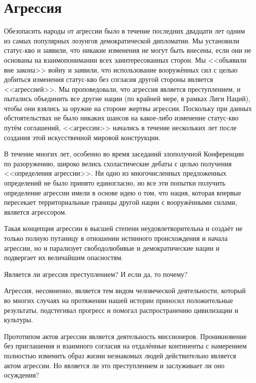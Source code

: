 \chapter{Агрессия}

Обезопасить народы от агрессии было в течение последних двадцати лет одним из самых популярных лозунгов демократической дипломатии. Мы установили статус-кво и заявили, что никакие изменения не могут быть внесены, если они не основаны на взаимопонимании всех заинтересованных сторон. Мы <<объявили вне закона>> войну и заявили, что использование вооружённых сил с целью добиться изменения статус-кво без согласия другой стороны является <<агрессией>>. Мы проповедовали, что агрессия является преступлением, и пытались объединить все другие нации (по крайней мере, в рамках Лиги Наций), чтобы они взялись за оружие на стороне жертвы агрессии. Поскольку при данных обстоятельствах не было никаких шансов на какое-либо изменение статус-кво путём соглашений, <<агрессии>> начались в течение нескольких лет после создания этой искусственной мировой конструкции.
 
В течение многих лет, особенно во время заседаний злополучной Конференции по разоружению, широко велись схоластические дебаты с целью получения <<определения агрессии>>. Ни одно из многочисленных предложенных определений не было принято единогласно, но все эти попытки получить определение агрессии имели в основе идею о том, что нация, которая впервые пересекает территориальные границы другой нации с вооружёнными силами, является агрессором.

Такая концепция агрессии в высшей степени неудовлетворительна и создаёт не только полную путаницу в отношении истинного происхождения и начала агрессии, но и парализует свободолюбивые и демократические нации и подвергает их величайшим опасностям.
 
Является ли агрессия преступлением? И если да, то почему?

Агрессия, несомненно, является тем видом человеческой деятельности, который во многих случаях на протяжении нашей истории приносил положительные результаты, подстегивал прогресс и помогал распространению цивилизации и культуры.
 
Прототипом актов агрессии является деятельность миссионеров. Проникновение без приглашения и взаимного согласия на отдалённые континенты с намерением полностью изменить образ жизни незнакомых людей действительно является актом агрессии. Но является ли это преступлением и заслуживает ли оно осуждения?

